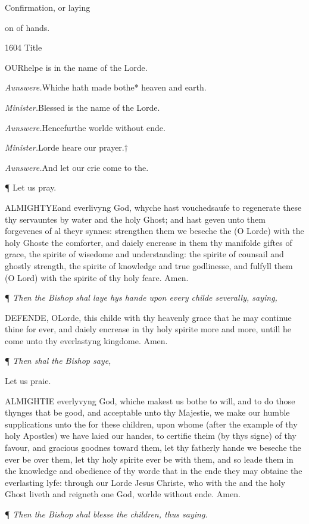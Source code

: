 Confirmation,
or laying

on
of hands.

1604
Title

OUR\textbf{}helpe is in the name of the Lorde.

\emph{Aunswere.}Whiche hath made bothe* heaven and
earth.

\emph{Minister.}Blessed is the name of the Lorde.

\emph{Aunswere.}Hencefurthe worlde without ende.

\emph{Minister.}Lorde heare our prayer.†

\emph{Aunswere.}And let our crie come to the.

¶
Let us pray.

ALMIGHTYE\textbf{}and everlivyng God, whyche hast vouchedsaufe to regenerate these thy
servauntes by water and the holy Ghost; and hast geven unto them forgevenes
of al theyr synnes: strengthen them we beseche the (O Lorde) with the
holy Ghoste the comforter, and daiely encrease in them thy manifolde giftes
of grace, the spirite of wisedome and understanding: the spirite of counsail
and ghostly strength, the spirite of knowledge and true godlinesse, and
fulfyll them (O Lord) with the spirite of thy holy feare. Amen.

¶
\emph{Then the Bishop shal laye hys hande upon every childe severally, saying,}

DEFENDE,
O\textbf{}Lorde, this childe with thy heavenly grace that he may continue
thine for ever, and daiely encrease in thy holy spirite more and more,
untill he come unto thy everlastyng kingdome. Amen.

¶
\emph{Then shal the Bishop saye,}

Let
us praie.

ALMIGHTIE
everlyvyng God, whiche makest us bothe to will, and to do those thynges
that be good, and acceptable unto thy Majestie, we make our humble supplications
unto the for these children, upon whome (after the example of thy holy
Apostles) we have laied our handes, to certifie theim (by thys signe)
of thy favour, and gracious goodnes toward them, let thy fatherly hande
we beseche the ever be over them, let thy holy spirite ever be with them,
and so leade them in the knowledge and obedience of thy worde that in
the ende they may obtaine the everlasting lyfe: through our Lorde Jesus
Christe, who with the and the holy Ghost liveth and reigneth one God,
worlde without ende. Amen.

¶
\emph{Then the Bishop shal blesse the children, thus saying.}

